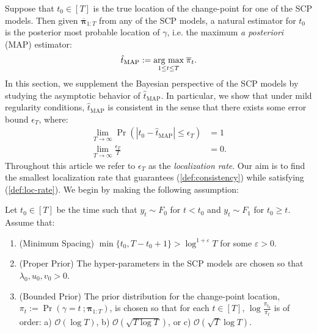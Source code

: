 Suppose that $t_0 \in [T]$ is the true location of the change-point for one of the SCP models. Then given $\overline{\boldsymbol{\pi}}_{1:T}$ from any of the SCP models, a natural estimator for $t_0$ is the posterior most probable location of $\gamma$, i.e. the maximum \textit{a posteriori} (MAP) estimator:
\begin{align}\label{eq:map}
    \hat{t}_{\text{MAP}} := \underset{1 \leq t \leq T}{\text{arg max}} \; \overline{\pi}_t.
\end{align}
In this section, we supplement the Bayesian perspective of the SCP models by studying the asymptotic behavior of $\hat{t}_{\text{MAP}}$. In particular, we show that under mild regularity conditions, $\hat{t}_{\text{MAP}}$ is consistent in the sense that there exists some error bound $\epsilon_T$, where:
\begin{align}
    \lim_{T\to\infty} \Pr\left(|t_0 - \hat{t}_{\text{MAP}}| \leq \epsilon_T\right) &= 1 \label{def:consistency} \\
    \lim_{T\to\infty} \frac{\epsilon_T}{T} &= 0. \label{def:loc-rate}
\end{align}
Throughout this article we refer to $\epsilon_T$ as the \textit{localization rate}. Our aim is to find the smallest localization rate that guarantees (\ref{def:consistency}) while satisfying (\ref{def:loc-rate}). We begin by making the following assumption:
\begin{assumption}\label{assumption:1}
    Let $t_0 \in [T]$ be the time such that $y_t \sim F_0$ for $t < t_0$ and $y_t \sim F_1$ for $t_0 \geq t$. Assume that: \vspace{-10pt}
    \begin{enumerate}[label=(\roman*)]
        \item (Minimum Spacing) $\min\{t_0,T-t_0 + 1\} > \log^{1+\varepsilon} T$ for some $\varepsilon > 0$. 
        \item (Proper Prior) The hyper-parameters in the SCP models are chosen so that $\lambda_0, u_0, v_0 > 0$.
        \item (Bounded Prior) The prior distribution for the change-point location, $\pi_t := \Pr(\gamma = t \:; \boldsymbol{\pi}_{1:T})$, is chosen so that for each $t\in[T]$, $\log \frac{\pi_{t_0}}{\pi_{t}}$ is of order: a) $\mathcal{O}(\log T)$, b) $\mathcal{O}(\sqrt{T\log T})$, or c) $\mathcal{O}(\sqrt{T}\log T)$.
    \end{enumerate}
\end{assumption}
\vspace{-10pt}

